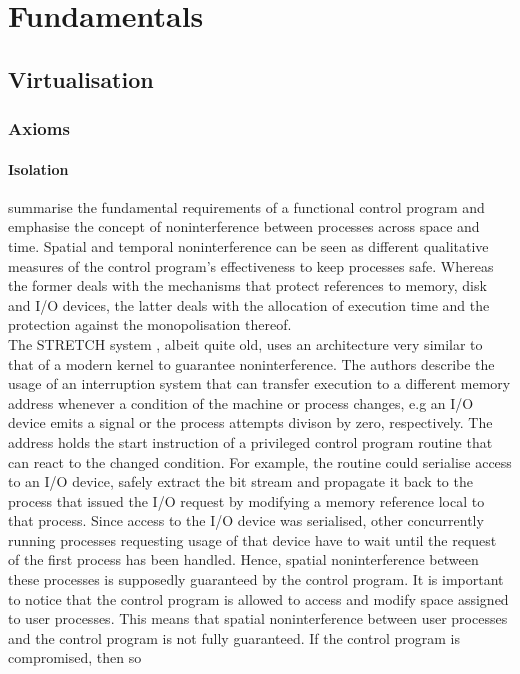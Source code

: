 \chapter{Fundamentals}
\section{Virtualisation}
\subsection{Axioms}
\subsubsection{Isolation}
\textcite{10.1145/368481.368502} summarise the fundamental
requirements of a functional control program and emphasise the concept of
noninterference between processes across space and time. Spatial and temporal noninterference 
can be seen as different qualitative measures of the control program's effectiveness to keep
processes safe. Whereas the former deals with the mechanisms that protect references to memory, disk
and I/O devices, the latter deals with the allocation of execution time and the protection against 
the monopolisation thereof.\\ 
The STRETCH system \cite{10.1145/368481.368502}, albeit quite old, 
uses an architecture very similar to that of a modern kernel to guarantee noninterference. 
The authors describe the usage of an interruption system that can transfer execution to a 
different memory address whenever a condition of the machine or process changes, e.g 
an I/O device emits a signal or the process attempts divison by zero, respectively.
The address holds the start instruction of a privileged control program routine that can react to the 
changed condition. For example, the routine could serialise access to an I/O device,
safely extract the bit stream and propagate it back to the process that issued the I/O request
by modifying a memory reference local to that process. Since access to the I/O device was 
serialised, other concurrently running processes requesting usage of that device have to wait
until the request of the first process has been handled. Hence, spatial noninterference between these 
processes is supposedly guaranteed by the control program.
It is important to notice that the control program is allowed to access and 
modify space assigned to user processes. This means that spatial noninterference between user processes 
and the control program is not fully guaranteed. If the control program is compromised, then so 

